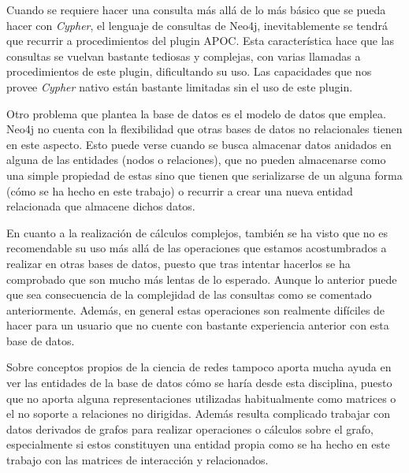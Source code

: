 Cuando se requiere hacer una consulta más allá de lo más básico que se pueda hacer con \textit{Cypher}, el lenguaje de consultas de Neo4j, inevitablemente se tendrá que recurrir a procedimientos del plugin APOC. Esta característica hace que las consultas se vuelvan bastante tediosas y complejas, con varias llamadas a procedimientos de este plugin, dificultando su uso. Las capacidades que nos provee \textit{Cypher} nativo están bastante limitadas sin el uso de este plugin.

Otro problema que plantea la base de datos es el modelo de datos que emplea. Neo4j no cuenta con la flexibilidad que otras bases de datos no relacionales tienen en este aspecto. Esto puede verse cuando se busca almacenar datos anidados en alguna de las entidades (nodos o relaciones), que no pueden almacenarse como una simple propiedad de estas sino que tienen que serializarse de un alguna forma (cómo se ha hecho en este trabajo) o recurrir a crear una nueva entidad relacionada que almacene dichos datos. 


En cuanto a la realización de cálculos complejos, también se ha visto que no es recomendable su uso más allá de las operaciones que estamos acostumbrados a realizar en otras bases de datos, puesto que tras intentar hacerlos se ha comprobado que son mucho más lentas de lo esperado. Aunque lo anterior puede que sea consecuencia de la complejidad de las consultas como se comentado anteriormente. Además, en general estas operaciones son realmente difíciles de hacer para un usuario que no cuente con bastante experiencia anterior con esta base de datos.

Sobre conceptos propios de la ciencia de redes tampoco aporta mucha ayuda en ver las entidades de la base de datos cómo se haría desde esta disciplina, puesto que no aporta alguna representaciones utilizadas habitualmente como matrices o el no soporte a relaciones no dirigidas. Además resulta complicado trabajar con datos derivados de grafos para realizar operaciones o cálculos sobre el grafo, especialmente si estos constituyen una entidad propia como se ha hecho en este trabajo con las matrices de interacción y relacionados.

